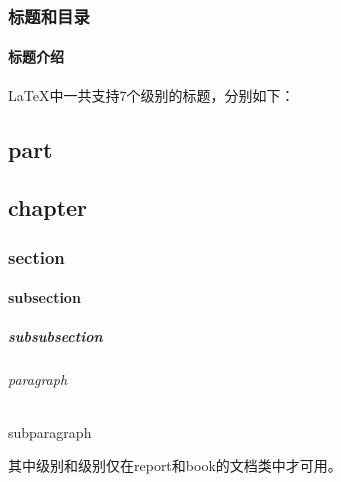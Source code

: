 
\section{标题和目录}\label{sec:标题和目录}
    
    \subsection{标题介绍}\label{subsec:标题介绍}
    \LaTeX{}中一共支持7个级别的标题，分别如下：
    \begin{texcode}
    \part{part} %
    \chapter{chapter} %
    \section{section} %
    \subsection{subsection} %
    \subsubsection{subsubsection} %
    \paragraph{paragraph} %
    \subparagraph{subparagraph} %
    \end{texcode}
    其中级别和级别仅在report和book的文档类中才可用。


